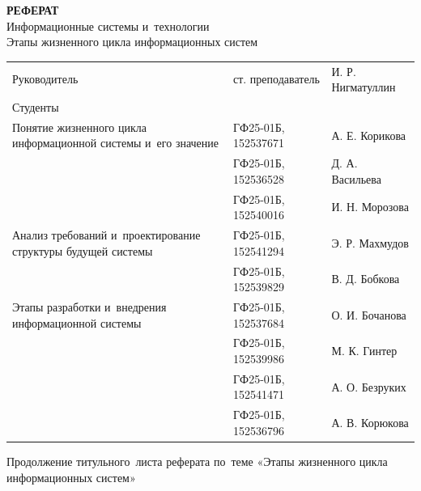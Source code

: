\documentclass{ou}
\begin{document}
\thispagestyle{empty}
\begin{center}
\shortstack{\FGAVO}\vspace{4\baselineskip}
\textbf{РЕФЕРАТ}\\
Информационные системы и~технологии\\
Этапы жизненного цикла информационных систем\vspace{2\baselineskip}\end{center}
\begin{flushleft}
\doublespacing
\begin{tabularx}{\textwidth}{@{} p{} l l @{}}
Руководитель & ст. преподаватель & И. Р. Нигматуллин\\
Студенты     &                   &                  \\
\multirow{-2.27}{\hsize}{\singlespacing Понятие жизненного цикла информационной системы и~его значение}
             & ГФ25-01Б, 152537671 & А. Е. Корикова\\
             & ГФ25-01Б, 152536528 & Д. А. Васильева\\
             & ГФ25-01Б, 152540016 & И. Н. Морозова\\
\multirow{-2.27}{\hsize}{\singlespacing Анализ требований и~проектирование структуры будущей системы}
             & ГФ25-01Б, 152541294 & Э. Р. Махмудов\\
             & ГФ25-01Б, 152539829 & В. Д. Бобкова\\
\multirow{-2.27}{\hsize}{\singlespacing Этапы разработки и~внедрения информационной системы}
             & ГФ25-01Б, 152537684 & О. И. Бочанова\\
             & ГФ25-01Б, 152539986 & М. К. Гинтер\\
             & ГФ25-01Б, 152541471 & А. О. Безруких\\
             & ГФ25-01Б, 152536796 & А. В. Корюкова\\
\end{tabularx}
\end{flushleft}
\vspace*{\fill}
\begin{center}
\city
\end{center}
\newpage
\thispagestyle{empty}
Продолжение титульного~листа реферата по~теме «Этапы жизненного цикла информационных систем»
\end{document}

